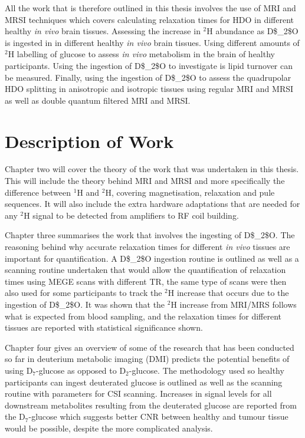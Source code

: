All the work that is therefore outlined in this thesis involves the use of \ac{MRI} and \ac{MRSI} techniques which covers calculating relaxation times for HDO in different healthy \textit{in vivo} brain tissues. Assessing the increase in $^2$H abundance as \Ac{D$_2$O} is ingested in in different healthy \textit{in vivo} brain tissues. Using different amounts of $^2$H labelling of glucose to assess \textit{in vivo} metabolism in the brain of healthy participants. Using the ingestion of \Ac{D$_2$O} to investigate is lipid turnover can be measured. Finally, using the ingestion of \Ac{D$_2$O} to assess the quadrupolar HDO splitting in anisotropic and isotropic tissues using regular \ac{MRI} and \ac{MRSI} as well as double quantum filtered \ac{MRI} and MRSI.

\section{Description of Work}

Chapter two will cover the theory of the work that was undertaken in this thesis. This will include the theory behind \ac{MRI} and \ac{MRSI} and more specifically the difference between $^1$H and $^2$H, covering magnetisation, relaxation and pule sequences. It will also include the extra hardware adaptations that are needed for any $^2$H signal to be detected from amplifiers to RF coil building.

Chapter three summarises the work that involves the ingesting of \ac{D$_2$O}. The reasoning behind why accurate relaxation times for different \textit{in vivo} tissues are important for quantification. A \ac{D$_2$O} ingestion routine is outlined as well as a scanning routine undertaken that would allow the quantification of relaxation times using \ac{MEGE} scans with different \ac{TR}, the same type of scans were then also used for some participants to track the $^2$H increase that occurs due to the ingestion of \ac{D$_2$O}. It was shown that the $^2$H increase from \ac{MRI}/\ac{MRS} follows what is expected from blood sampling, and the relaxation times for different tissues are reported with statistical significance shown.

Chapter four gives an overview of some of the research that has been conducted so far in deuterium metabolic imaging (DMI) predicts the potential benefits of using D$_7$-glucose as opposed to D$_2$-glucose. The methodology used so healthy participants can ingest deuterated glucose is outlined as well as the scanning routine with parameters for CSI scanning. Increases in signal levels for all downstream metabolites resulting from the deuterated glucose are reported from the D$_7$-glucose which suggests better \ac{CNR} between healthy and tumour tissue would be possible, despite the more complicated analysis.

